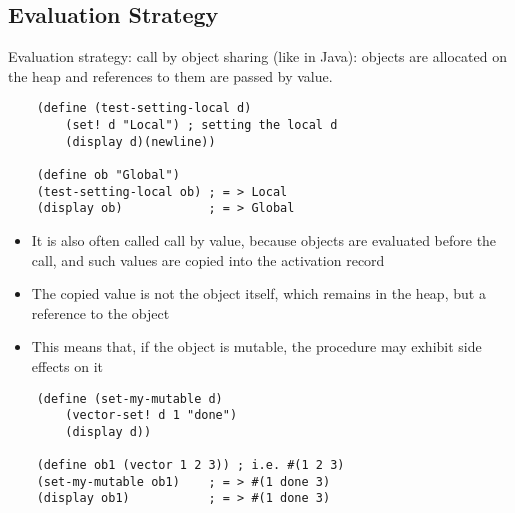 \subsection{Evaluation Strategy}
Evaluation strategy: call by object sharing (like in Java): objects are allocated on the heap and references to them are passed by value.
\begin{lstlisting}
    (define (test-setting-local d)
        (set! d "Local") ; setting the local d
        (display d)(newline))

    (define ob "Global")
    (test-setting-local ob) ; = > Local
    (display ob)            ; = > Global
\end{lstlisting}
\begin{itemize}
    \item It is also often called call by value, because objects are evaluated before the call, and such values are copied into the activation record
    \item The copied value is not the object itself, which remains in the heap, but a reference to the object
    \item This means that, if the object is mutable, the procedure may exhibit side effects on it
\end{itemize}
\begin{lstlisting}
    (define (set-my-mutable d)
        (vector-set! d 1 "done")
        (display d))

    (define ob1 (vector 1 2 3)) ; i.e. #(1 2 3)
    (set-my-mutable ob1)    ; = > #(1 done 3)
    (display ob1)           ; = > #(1 done 3)
\end{lstlisting}


